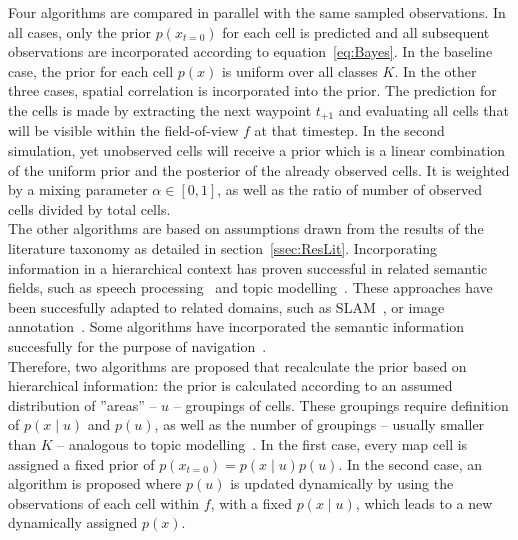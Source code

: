 \documentclass[twocolumn,letterpaper]{IEEEAerospaceCLS}  %
\begin{document}
Four algorithms are compared in parallel with the same sampled observations. In all cases, only the prior $p(x_{t=0})$ for each cell is predicted and all subsequent observations are incorporated according to equation~\ref{eq:Bayes}. In the baseline case, the prior for each cell $p(x)$ is uniform over all classes $K$. In the other three cases, spatial correlation is incorporated into the prior. The prediction for the cells is made by extracting the next waypoint $t_{+1}$ and evaluating all cells that will be visible within the field-of-view $f$ at that timestep. In the second simulation, yet unobserved cells will receive a prior which is a linear combination of the uniform prior and the posterior of the already observed cells. It is weighted by a mixing parameter $\alpha \in [0, 1]$, as well as the ratio of number of observed cells divided by total cells.\\
The other algorithms are based on assumptions drawn from the results of the literature taxonomy as detailed in section~\ref{ssec:ResLit}. Incorporating information in a hierarchical context has proven successful in related semantic fields, such as speech processing~\cite{fine_hierarchical_1998} and topic modelling~\cite{blei_latent_2003}. These approaches have been succesfully adapted to related domains, such as SLAM~\cite{zhang_hierarchical_2019}, or image annotation~\cite{fei-fei_bayesian_2005,lienou_semantic_2010}. Some algorithms have incorporated the semantic information succesfully for the purpose of navigation~\cite{koch_automatic_2019,chaplot_object_2020,wu_learning_2018,alirezaie_exploiting_2017}.\\
Therefore, two algorithms are proposed that recalculate the prior based on hierarchical information: the prior is calculated according to an assumed distribution of ''areas'' -- $u$ -- groupings of cells. These groupings require definition of $p(x\mid u)$ and $p(u)$, as well as the number of groupings -- usually smaller than $K$ -- analogous to topic modelling~\cite{blei_latent_2003}. In the first case, every map cell is assigned a fixed prior of $p(x_{t=0}) = p(x\mid u)p(u)$. In the second case, an algorithm is proposed where $p(u)$ is updated dynamically by using the observations of each cell within $f$, with a fixed $p(x\mid u)$, which leads to a new dynamically assigned $p(x)$.\\
\end{document}
